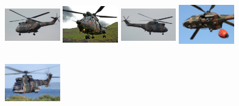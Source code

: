 \begin{figure}[H]
\centering
\subcaptionbox{}
  {\includegraphics[height=2.4cm, width=2.4cm]{images/real-images/helicopter/1.png}}
\subcaptionbox{}%
  {\includegraphics[height=2.4cm, width=2.4cm]{images/real-images/helicopter/2.jpg}}
\subcaptionbox{}%
  {\includegraphics[height=2.4cm, width=2.4cm]{images/real-images/helicopter/3.png}}
\subcaptionbox{}
  {\includegraphics[height=2.4cm, width=2.4cm]{images/real-images/helicopter/4.jpg}}
\subcaptionbox{}%
  {\includegraphics[height=2.4cm, width=2.4cm]{images/real-images/helicopter/5.jpeg}}


\end{figure}
